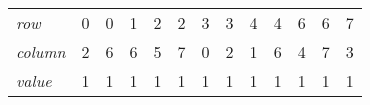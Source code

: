 \begin{tabular}{>{\em}l @{\hskip5mm} |*{12}{c|}} \cline{2-13}
    row    & 0 & 0 & 1 & 2 & 2 & 3 & 3 & 4 & 4 & 6 & 6 & 7 \\ \cline{2-13}
    column & 2 & 6 & 6 & 5 & 7 & 0 & 2 & 1 & 6 & 4 & 7 & 3 \\ \cline{2-13}
    value  & 1 & 1 & 1 & 1 & 1 & 1 & 1 & 1 & 1 & 1 & 1 & 1 \\ \cline{2-13}
\end{tabular}